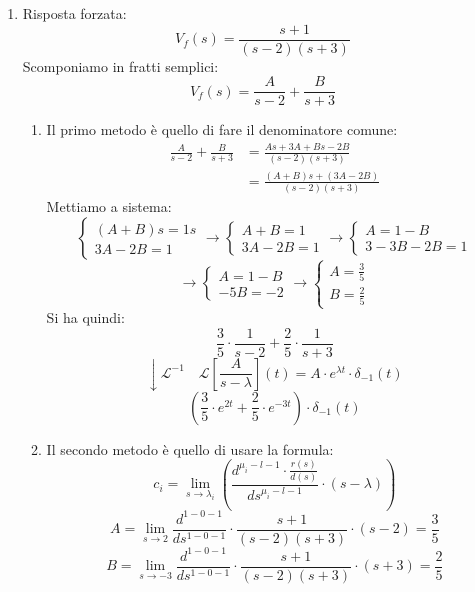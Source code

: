 \documentclass[a4paper]{article}
\begin{document}
\begin{example}
\begin{enumerate}
    \item Risposta forzata:
      \[
        V_f(s) = \frac{s+1}{(s-2)(s+3)}
      \] 
      Scomponiamo in fratti semplici:
      \[
        V_f(s) = \frac{A}{s-2} + \frac{B}{s+3}
      \]
      \begin{enumerate}
        \item Il primo metodo è quello di fare il denominatore comune:
          \[
            \begin{aligned}
              \frac{A}{s-2} + \frac{B}{s+3} &= \frac{As+3A+Bs-2B}{(s-2)(s+3)}\\
                                            &= \frac{(A+B)s + (3A-2B)}{(s-2)(s+3)}
            \end{aligned}
          \] 
          Mettiamo a sistema:
          \[
          \begin{cases}
            (A+B)s = 1s\\
            3A-2B = 1
          \end{cases}
          \to 
          \begin{cases}
            A+B = 1\\
            3A-2B = 1
          \end{cases}
          \to
          \begin{cases}
            A = 1-B\\
            3-3B-2B = 1
          \end{cases}
          \]\[
          \to
          \begin{cases}
            A = 1-B\\
            -5B = -2
          \end{cases}
          \to 
          \begin{cases}
            A = \frac{3}{5}\\
            B = \frac{2}{5}
          \end{cases}
          \] 
          Si ha quindi:
          \[
            \frac{3}{5} \cdot \frac{1}{s-2} + \frac{2}{5} \cdot \frac{1}{s+3}
          \] 
          \[
            \downarrow \mathcal{L}^{-1} \quad \mathcal{L}\left[ \frac{A}{s-\lambda} \right](t) = A \cdot e^{\lambda t} \cdot \delta_{-1}(t)
          \] 
          \[
            \left( \frac{3}{5} \cdot e^{2t} + \frac{2}{5} \cdot e^{-3t} \right) \cdot \delta_{-1}(t)
          \] 

        \item Il secondo metodo è quello di usare la formula:
          \[
            c_i = \lim_{s \to \lambda_i} \left( \frac{d^{\mu_i-l-1} \cdot \frac{r(s)}{d(s)}}{d s^{\mu_i-l-1}} \cdot (s-\lambda) \right)  
          \] 
          \[
            A = \lim_{s \to 2} \frac{d^{1-0-1}}{ds^{1-0-1}} \cdot \frac{s+1}{(s-2)(s+3)} \cdot (s-2) = \frac{3}{5}
          \] 
          \[
            B = \lim_{s \to -3} \frac{d^{1-0-1}}{ds^{1-0-1}} \cdot \frac{s+1}{(s-2)(s+3)} \cdot (s+3) = \frac{2}{5}
          \] 
      \end{enumerate}


\end{enumerate}
\end{example}
\end{document}

